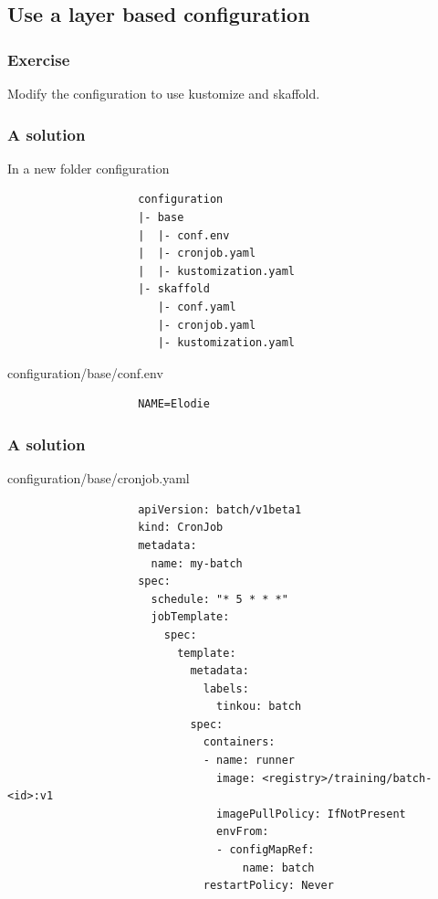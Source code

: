 \subsection{Use a layer based configuration}	
	
	\begin{frame}
		\frametitle{Exercise}
		
		Modify the configuration to use kustomize and skaffold.
	\end{frame}
	
	\begin{frame}[fragile]
		\frametitle{A solution}
		
		\begin{block}{In a new folder configuration}
			\begin{small}
				\begin{verbatim}
					configuration
					|- base
					|  |- conf.env
					|  |- cronjob.yaml
					|  |- kustomization.yaml
					|- skaffold
					   |- conf.yaml
					   |- cronjob.yaml
					   |- kustomization.yaml
				\end{verbatim}
			\end{small}
		\end{block}

		\begin{block}{configuration/base/conf.env}
			\begin{small}
				\begin{verbatim}
					NAME=Elodie
				\end{verbatim}
			\end{small}
		\end{block}

	\end{frame}
	
	\begin{frame}[fragile]
		\frametitle{A solution}
				
		\begin{block}{configuration/base/cronjob.yaml}
			\begin{tiny}
				\begin{verbatim}
					apiVersion: batch/v1beta1
					kind: CronJob
					metadata:
					  name: my-batch
					spec:
					  schedule: "* 5 * * *"
					  jobTemplate:
					    spec:
					      template:
					        metadata:
					          labels:
					            tinkou: batch
					        spec:
					          containers:
					          - name: runner
					            image: <registry>/training/batch-<id>:v1
					            imagePullPolicy: IfNotPresent 
					            envFrom:
					            - configMapRef:
					                name: batch
					          restartPolicy: Never
				\end{verbatim}
			\end{tiny}
		\end{block}
	\end{frame}
	
